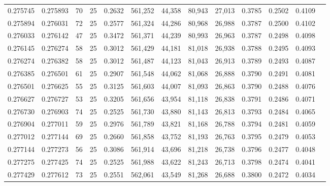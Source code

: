 \begin{tabular}{rrrrrrrrrrrrr}
0.275745 & 0.275893 &    70 &  25 &                                     0.2632 & 561,252 &  44,358 &  80,943 &  27,013 & 0.3785 & 0.2502 & 0.4109 \\
0.275894 & 0.276031 &    72 &  25 &                                     0.2577 & 561,324 &  44,286 &  80,968 &  26,988 & 0.3787 & 0.2500 & 0.4102 \\
0.276033 & 0.276142 &    47 &  25 &                                     0.3472 & 561,371 &  44,239 &  80,993 &  26,963 & 0.3787 & 0.2498 & 0.4098 \\
0.276145 & 0.276274 &    58 &  25 &                                     0.3012 & 561,429 &  44,181 &  81,018 &  26,938 & 0.3788 & 0.2495 & 0.4093 \\
0.276274 & 0.276382 &    58 &  25 &                                     0.3012 & 561,487 &  44,123 &  81,043 &  26,913 & 0.3789 & 0.2493 & 0.4087 \\
0.276385 & 0.276501 &    61 &  25 &                                     0.2907 & 561,548 &  44,062 &  81,068 &  26,888 & 0.3790 & 0.2491 & 0.4081 \\
0.276501 & 0.276625 &    55 &  25 &                                     0.3125 & 561,603 &  44,007 &  81,093 &  26,863 & 0.3790 & 0.2488 & 0.4076 \\
0.276627 & 0.276727 &    53 &  25 &                                     0.3205 & 561,656 &  43,954 &  81,118 &  26,838 & 0.3791 & 0.2486 & 0.4071 \\
0.276730 & 0.276903 &    74 &  25 &                                     0.2525 & 561,730 &  43,880 &  81,143 &  26,813 & 0.3793 & 0.2484 & 0.4065 \\
0.276904 & 0.277011 &    59 &  25 &                                     0.2976 & 561,789 &  43,821 &  81,168 &  26,788 & 0.3794 & 0.2481 & 0.4059 \\
0.277012 & 0.277144 &    69 &  25 &                                     0.2660 & 561,858 &  43,752 &  81,193 &  26,763 & 0.3795 & 0.2479 & 0.4053 \\
0.277144 & 0.277273 &    56 &  25 &                                     0.3086 & 561,914 &  43,696 &  81,218 &  26,738 & 0.3796 & 0.2477 & 0.4048 \\
0.277275 & 0.277425 &    74 &  25 &                                     0.2525 & 561,988 &  43,622 &  81,243 &  26,713 & 0.3798 & 0.2474 & 0.4041 \\
0.277429 & 0.277612 &    73 &  25 &                                     0.2551 & 562,061 &  43,549 &  81,268 &  26,688 & 0.3800 & 0.2472 & 0.4034 \\

\end{tabular}
